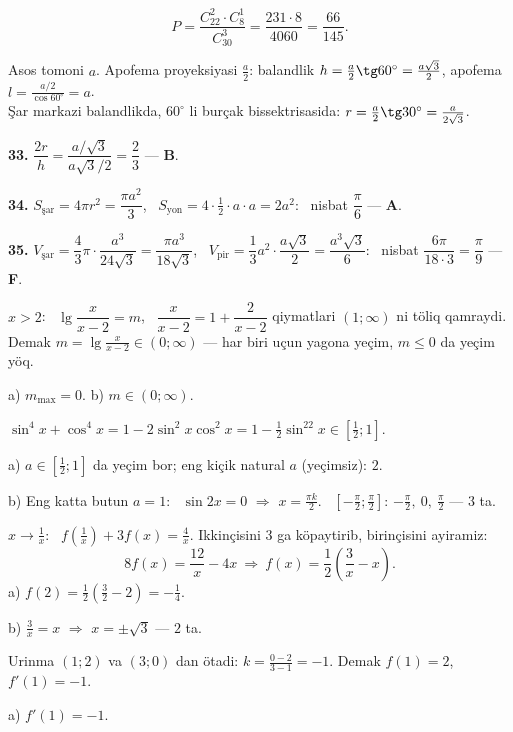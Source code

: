\[P=\frac{C_{22}^2\cdot C_8^1}{C_{30}^3}=\frac{231\cdot8}{4060}=\frac{66}{145}.\]

\newpage
{}
Asos tomoni $a$. Apofema proyeksiyasi $\frac a2$: balandlik $h=\frac a2\tg60^\circ=\frac{a\sqrt3}2$, apofema $l=\frac{a/2}{\cos60^\circ}=a$.\\
Şar markazi balandlikda, $60^\circ$ li burçak bissektrisasida: $r=\frac a2\tg30^\circ=\frac a{2\sqrt3}$.

\textbf{33.} $\dfrac{2r}h=\dfrac{a/\sqrt3}{a\sqrt3/2}=\dfrac23$ — \textbf{B}.

\textbf{34.} $S_{\text{şar}}=4\pi r^2=\dfrac{\pi a^2}3$, \ $S_{\text{yon}}=4\cdot\frac12\cdot a\cdot a=2a^2$: \ nisbat $\dfrac\pi6$ — \textbf{A}.

\textbf{35.} $V_{\text{şar}}=\dfrac43\pi\cdot\dfrac{a^3}{24\sqrt3}=\dfrac{\pi a^3}{18\sqrt3}$, \ $V_{\text{pir}}=\dfrac13a^2\cdot\dfrac{a\sqrt3}2=\dfrac{a^3\sqrt3}6$: \ nisbat $\dfrac{6\pi}{18\cdot3}=\dfrac\pi9$ — \textbf{F}.

\newpage
{}
$x>2$: \ $\lg\dfrac x{x-2}=m$, \ $\dfrac x{x-2}=1+\dfrac2{x-2}$ qiymatlari $(1;\infty)$ ni töliq qamraydi.\\
Demak $m=\lg\frac x{x-2}\in(0;\infty)$ — har biri uçun yagona yeçim, $m\le0$ da yeçim yöq.

a) $m_{\max}=0$. \quad b) $m\in(0;\infty)$.

\newpage
{}
$\sin^4x+\cos^4x=1-2\sin^2x\cos^2x=1-\frac12\sin^22x\in\left[\frac12;1\right]$.

a) $a\in\left[\frac12;1\right]$ da yeçim bor; eng kiçik natural $a$ (yeçimsiz): $2$.

b) Eng katta butun $a=1$: \ $\sin2x=0$ $\Rightarrow$ $x=\frac{\pi k}2$. \ $\left[-\frac\pi2;\frac\pi2\right]$: $-\frac\pi2,\ 0,\ \frac\pi2$ — $3$ ta.

\newpage
{}
$x\to\frac1x$: \ $f\left(\frac1x\right)+3f(x)=\frac4x$. Ikkinçisini $3$ ga köpaytirib, birinçisini ayiramiz:
\[8f(x)=\frac{12}x-4x\ \Rightarrow\ f(x)=\frac12\left(\frac3x-x\right).\]
a) $f(2)=\frac12\left(\frac32-2\right)=-\frac14$.

b) $\frac3x=x$ $\Rightarrow$ $x=\pm\sqrt3$ — $2$ ta.

\newpage
{}
Urinma $(1;2)$ va $(3;0)$ dan ötadi: $k=\frac{0-2}{3-1}=-1$. Demak $f(1)=2$, $f'(1)=-1$.

a) $f'(1)=-1$.

